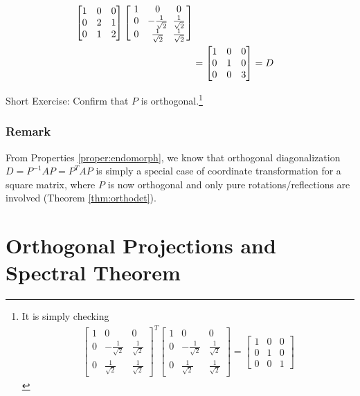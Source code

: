 \begin{solution}
\begin{align*}
\begin{bmatrix}
1 & 0 & 0 \\
0 & 2 & 1 \\
0 & 1 & 2
\end{bmatrix}
\left[\begin{array}{@{}wc{12pt}wc{12pt}wc{12pt}@{\,}}
1 & 0 & 0 \\
0 & -\frac{1}{\sqrt{2}} & \frac{1}{\sqrt{2}} \\
0 & \frac{1}{\sqrt{2}} & \frac{1}{\sqrt{2}}
\end{array}\right] \\
&= 
\begin{bmatrix}
1 & 0 & 0\\
0 & 1 & 0\\
0 & 0 & 3 
\end{bmatrix} = D
\end{align*}
\end{solution}
Short Exercise: Confirm that $P$ is orthogonal.\footnote{It is simply checking
\begin{align*}
\begin{bmatrix}
1 & 0 & 0 \\
0 & -\frac{1}{\sqrt{2}} & \frac{1}{\sqrt{2}} \\
0 & \frac{1}{\sqrt{2}} & \frac{1}{\sqrt{2}}
\end{bmatrix}^T
\begin{bmatrix}
1 & 0 & 0 \\
0 & -\frac{1}{\sqrt{2}} & \frac{1}{\sqrt{2}} \\
0 & \frac{1}{\sqrt{2}} & \frac{1}{\sqrt{2}}
\end{bmatrix} = 
\begin{bmatrix}
1 & 0 & 0 \\
0 & 1 & 0 \\
0 & 0 & 1
\end{bmatrix}
\end{align*}
}

\subsubsection{Remark} From Properties \ref{proper:endomorph}, we know that orthogonal diagonalization $D = P^{-1}AP = P^TAP$ is simply a special case of coordinate transformation for a square matrix, where $P$ is now orthogonal and only pure rotations/reflections are involved (Theorem \ref{thm:orthodet}).

\section{Orthogonal Projections and Spectral Theorem}

